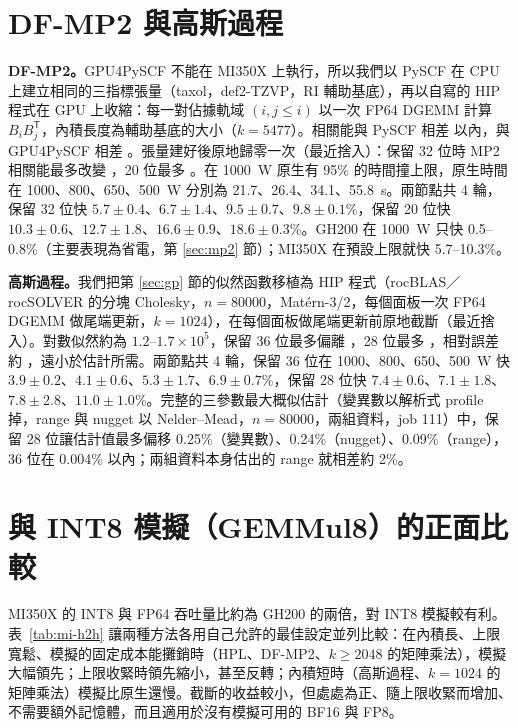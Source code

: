 \section{DF-MP2 與高斯過程}\label{sec:mi-apps}

\textbf{DF-MP2。}GPU4PySCF 不能在 MI350X 上執行，所以我們以 PySCF 在 CPU 上建立相同的三指標張量（taxol，def2-TZVP，RI 輔助基底），再以自寫的 HIP 程式在 GPU 上收縮：每一對佔據軌域 $(i, j\le i)$ 以一次 FP64 DGEMM 計算 $B_iB_j^{\mathsf T}$，內積長度為輔助基底的大小（$k=5477$）。相關能與 PySCF 相差 \Eh 以內，與 GPU4PySCF 相差 \Eh。張量建好後原地歸零一次（最近捨入）：保留 32 位時 MP2 相關能最多改變 \Eh，20 位最多 \Eh。在 1000~W 原生有 95\% 的時間撞上限，原生時間在 1000、800、650、500~W 分別為 21.7、26.4、34.1、55.8~s。兩節點共 4 輪，保留 32 位快 $5.7\pm0.4$、$6.7\pm1.4$、$9.5\pm0.7$、$9.8\pm0.1$\%，保留 20 位快 $10.3\pm0.6$、$12.7\pm1.8$、$16.6\pm0.9$、$18.6\pm0.3$\%。GH200 在 1000~W 只快 0.5–0.8\%（主要表現為省電，第 \ref{sec:mp2} 節）；MI350X 在預設上限就快 5.7–10.3\%。

\textbf{高斯過程。}我們把第 \ref{sec:gp} 節的似然函數移植為 HIP 程式（rocBLAS／rocSOLVER 的分塊 Cholesky，$n=80000$，Matérn-3/2，每個面板一次 FP64 DGEMM 做尾端更新，$k=1024$），在每個面板做尾端更新前原地截斷（最近捨入）。對數似然約為 $1.2$–$1.7\times10^{5}$，保留 36 位最多偏離 ，28 位最多 ，相對誤差約 ，遠小於估計所需。兩節點共 4 輪，保留 36 位在 1000、800、650、500~W 快 $3.9\pm0.2$、$4.1\pm0.6$、$5.3\pm1.7$、$6.9\pm0.7$\%，保留 28 位快 $7.4\pm0.6$、$7.1\pm1.8$、$7.8\pm2.8$、$11.0\pm1.0$\%。完整的三參數最大概似估計（變異數以解析式 profile 掉，range 與 nugget 以 Nelder–Mead，$n=80000$，兩組資料，job 111）中，保留 28 位讓估計值最多偏移 0.25\%（變異數）、0.24\%（nugget）、0.09\%（range），36 位在 0.004\% 以內；兩組資料本身估出的 range 就相差約 2\%。

\section{與 INT8 模擬（GEMMul8）的正面比較}\label{sec:mi-emu}

MI350X 的 INT8 與 FP64 吞吐量比約為 GH200 的兩倍，對 INT8 模擬較有利。表~\ref{tab:mi-h2h} 讓兩種方法各用自己允許的最佳設定並列比較：在內積長、上限寬鬆、模擬的固定成本能攤銷時（HPL、DF-MP2、$k\ge2048$ 的矩陣乘法），模擬大幅領先；上限收緊時領先縮小，甚至反轉；內積短時（高斯過程、$k=1024$ 的矩陣乘法）模擬比原生還慢。截斷的收益較小，但處處為正、隨上限收緊而增加、不需要額外記憶體，而且適用於沒有模擬可用的 BF16 與 FP8。

